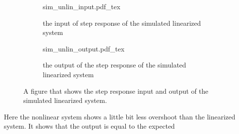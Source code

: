 \documentclass[12pt]{article}
\begin{document}
\begin{figure}[H]
\centering
\begin{subfigure}{0.5\textwidth}
  \def\svgwidth{\textwidth}
  {sim_unlin_input.pdf_tex}
  \label{}
  \centering
  \caption{the input of step response of the simulated linearized system} \label{my_input_step_li}
\end{subfigure}%
\begin{subfigure}{0.5\textwidth}
  \centering
  \def\svgwidth{\textwidth}
  {sim_unlin_output.pdf_tex}
  \caption{the output of the step response of the simulated linearized system} \label{my_output_step_li}
\end{subfigure}
\caption{A figure that shows the step response input and output of the simulated linearized system.}
\label{fig:step_li}
\end{figure}

Here the nonlinear system shows a little bit less overshoot than the linearized system. It shows that the output is equal to the expected


\begin{figure}

\end{figure}
\end{document}
